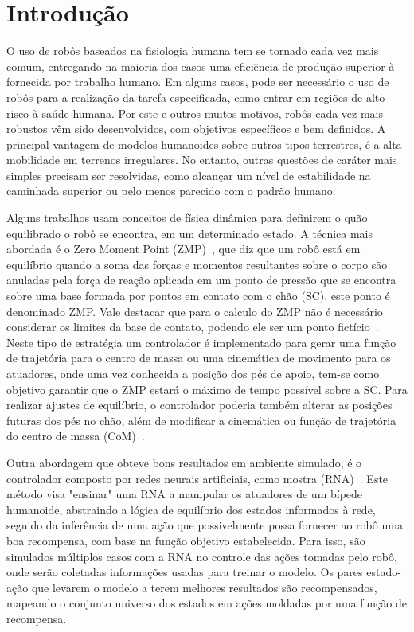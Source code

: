 \chapter{Introdução}
\label{cap:intro}
O uso de robôs baseados na fisiologia humana tem se tornado cada vez mais comum, entregando na maioria dos casos uma eficiência de produção superior à fornecida por trabalho humano. Em alguns casos, pode ser necessário o uso de robôs para a realização da tarefa especificada, como entrar em regiões de alto risco à saúde humana. Por este e outros muitos motivos, robôs cada vez mais robustos vêm sido desenvolvidos, com objetivos específicos e bem definidos. A principal vantagem de modelos humanoides sobre outros tipos terrestres, é a alta mobilidade em terrenos irregulares. No entanto, outras questões de caráter mais simples precisam ser resolvidas, como alcançar um nível de estabilidade na caminhada superior ou pelo menos parecido com o padrão humano.

Alguns trabalhos usam conceitos de física dinâmica para definirem o quão equilibrado o robô se encontra, em um determinado estado. A técnica mais abordada é o Zero Moment Point (ZMP)~\cite{Vukobratovic1968}, que diz que um robô está em equilíbrio quando a soma das forças e momentos resultantes sobre o corpo são anuladas pela força de reação aplicada em um ponto de pressão que se encontra sobre uma base formada por pontos em contato com o chão (SC), este ponto é denominado ZMP. Vale destacar que para o calculo do ZMP não é necessário considerar os limites da base de contato, podendo ele ser um ponto fictício~\cite{Vukobratovic2004}. Neste tipo de estratégia um controlador é implementado para gerar uma função de trajetória para o centro de massa ou uma cinemática de movimento para os atuadores, onde uma vez conhecida a posição dos pés de apoio, tem-se como objetivo garantir que o ZMP estará o máximo de tempo possível sobre a SC. Para realizar ajustes de equilíbrio, o controlador poderia também alterar as posições futuras dos pés no chão, além de modificar a cinemática ou função de trajetória do centro de massa (CoM)~\cite{Maximo2017}.

Outra abordagem que obteve bons resultados em ambiente simulado, é o controlador composto por redes neurais artificiais, como mostra (RNA)~\cite{Bin2017,Schulman2017}. Este método visa "ensinar" uma RNA a manipular os atuadores de um bípede humanoide, abstraindo a lógica de equilíbrio dos estados informados à rede, seguido da inferência de uma ação que possivelmente possa fornecer ao robô uma boa recompensa, com base na função objetivo estabelecida. Para isso, são simulados múltiplos casos com a RNA no controle das ações tomadas pelo robô, onde serão coletadas informações usadas para treinar o modelo. Os pares estado-ação que levarem o modelo a terem melhores resultados são recompensados, mapeando o conjunto universo dos estados em ações moldadas por uma função de recompensa.

